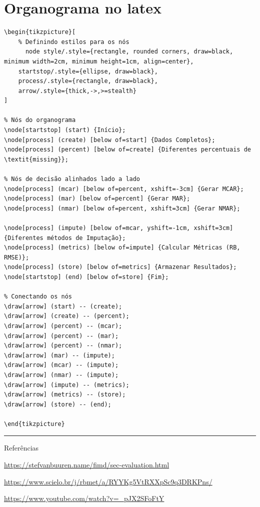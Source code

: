 \documentclass[11pt]{article}
\begin{document}
\section*{Organograma no latex}
\begin{verbatim}
\begin{tikzpicture}[
    % Definindo estilos para os nós
      node style/.style={rectangle, rounded corners, draw=black, minimum width=2cm, minimum height=1cm, align=center},
    startstop/.style={ellipse, draw=black},
    process/.style={rectangle, draw=black},
    arrow/.style={thick,->,>=stealth}
]

% Nós do organograma
\node[startstop] (start) {Início};
\node[process] (create) [below of=start] {Dados Completos};
\node[process] (percent) [below of=create] {Diferentes percentuais de \textit{missing}};

% Nós de decisão alinhados lado a lado
\node[process] (mcar) [below of=percent, xshift=-3cm] {Gerar MCAR};
\node[process] (mar) [below of=percent] {Gerar MAR};
\node[process] (nmar) [below of=percent, xshift=3cm] {Gerar NMAR};

\node[process] (impute) [below of=mcar, yshift=-1cm, xshift=3cm] {Diferentes métodos de Imputação};
\node[process] (metrics) [below of=impute] {Calcular Métricas (RB, RMSE)};
\node[process] (store) [below of=metrics] {Armazenar Resultados};
\node[startstop] (end) [below of=store] {Fim};

% Conectando os nós
\draw[arrow] (start) -- (create);
\draw[arrow] (create) -- (percent);
\draw[arrow] (percent) -- (mcar);
\draw[arrow] (percent) -- (mar);
\draw[arrow] (percent) -- (nmar);
\draw[arrow] (mar) -- (impute);
\draw[arrow] (mcar) -- (impute);
\draw[arrow] (nmar) -- (impute);
\draw[arrow] (impute) -- (metrics);
\draw[arrow] (metrics) -- (store);
\draw[arrow] (store) -- (end);

\end{tikzpicture}

\end{verbatim}

\noindent\rule{\textwidth}{0.5pt}
Referências

\href{https://stefvanbuuren.name/fimd/sec-evaluation.html}{https://stefvanbuuren.name/fimd/sec-evaluation.html}

\href{https://www.scielo.br/j/rbmet/a/RYYKg5VtRXXpSc9q3DRKPns/}{https://www.scielo.br/j/rbmet/a/RYYKg5VtRXXpSc9q3DRKPns/}

\href{https://www.youtube.com/watch?v=_pJX2SFoFtY}{https://www.youtube.com/watch?v=\_pJX2SFoFtY}
\end{document}
